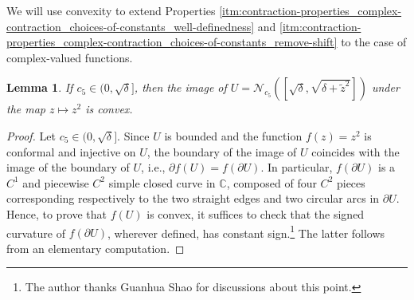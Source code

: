 \documentclass[11pt]{article}
\newcommand{\C}{\mathbb C}
\newcommand{\tz}{\tilde{z}}
\numberwithin{equation}{section}
\theoremstyle{plain}
\newtheorem{lemma}[theorem]{Lemma}
\theoremstyle{definition}
\theoremstyle{remark}
\begin{document}
We will use convexity \cite{peters2019conjecture} to extend Properties \ref{itm:contraction-properties_complex-contraction_choices-of-constants_well-definedness} and \ref{itm:contraction-properties_complex-contraction_choices-of-constants_remove-shift} to the case of complex-valued functions.

\begin{lemma}
\label{lem:contraction-properties_complex-contraction_convex-image}
If $c_{5}\in(0,\sqrt{\delta}]$, then the image of $U=\mathcal{N}_{c_{5}}([\sqrt{\delta},\sqrt{\delta+\tz^{2}}])$ under the map $z\mapsto z^{2}$ is convex.
\end{lemma}

\begin{proof}
Let $c_{5}\in(0,\sqrt{\delta}]$.
Since $U$ is bounded and the function $f(z)=z^{2}$ is conformal and injective on $U$, the boundary of the image of $U$ coincides with the image of the boundary of $U$, i.e., $\partial f(U)=f(\partial U)$.
In particular, $f(\partial U)$ is a $C^{1}$ and piecewise $C^{2}$ simple closed curve in $\C$, composed of four $C^{2}$ pieces corresponding respectively to the two straight edges and two circular arcs in $\partial U$.
Hence, to prove that $f(U)$ is convex, it suffices to check that the signed curvature of $f(\partial U)$, wherever defined, has constant sign.\footnote{The author thanks Guanhua Shao for discussions about this point.}
The latter follows from an elementary computation.
\end{proof}
\end{document}
